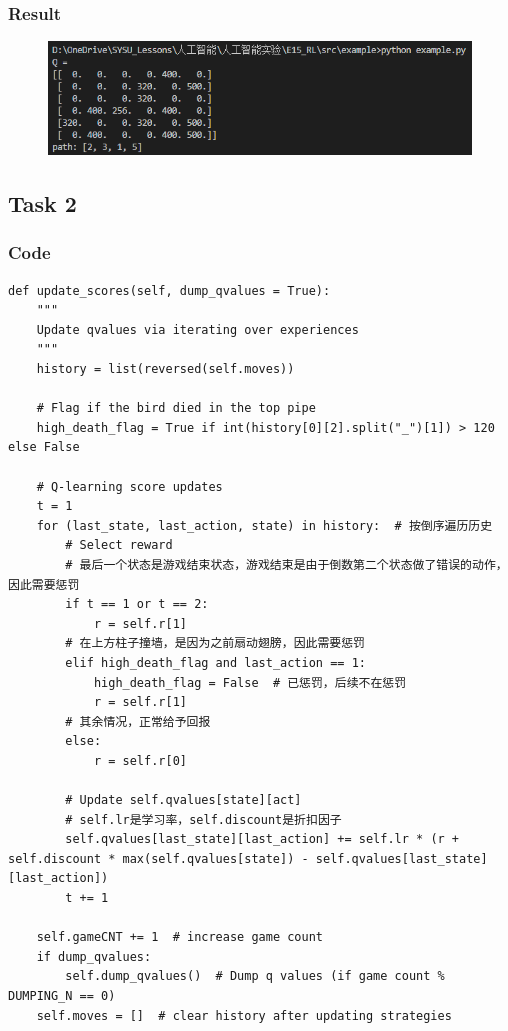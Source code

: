 \documentclass[a4paper, 11pt]{article}
\begin{document}
\subsubsection{Result}
\begin{figure}[ht]
\centering
\includegraphics[width=12cm]{Pic/result_1.png}
\end{figure}

\subsection{Task 2}
\subsubsection{Code}
\begin{lstlisting}
def update_scores(self, dump_qvalues = True):
    """
    Update qvalues via iterating over experiences
    """
    history = list(reversed(self.moves))

    # Flag if the bird died in the top pipe
    high_death_flag = True if int(history[0][2].split("_")[1]) > 120 else False

    # Q-learning score updates
    t = 1
    for (last_state, last_action, state) in history:  # 按倒序遍历历史
        # Select reward
        # 最后一个状态是游戏结束状态，游戏结束是由于倒数第二个状态做了错误的动作，因此需要惩罚
        if t == 1 or t == 2:
            r = self.r[1]
        # 在上方柱子撞墙，是因为之前扇动翅膀，因此需要惩罚
        elif high_death_flag and last_action == 1:
            high_death_flag = False  # 已惩罚，后续不在惩罚
            r = self.r[1]
        # 其余情况，正常给予回报
        else:
            r = self.r[0]

        # Update self.qvalues[state][act]
        # self.lr是学习率，self.discount是折扣因子
        self.qvalues[last_state][last_action] += self.lr * (r + self.discount * max(self.qvalues[state]) - self.qvalues[last_state][last_action])
        t += 1

    self.gameCNT += 1  # increase game count
    if dump_qvalues:
        self.dump_qvalues()  # Dump q values (if game count % DUMPING_N == 0)
    self.moves = []  # clear history after updating strategies

\end{lstlisting}
\end{document}
